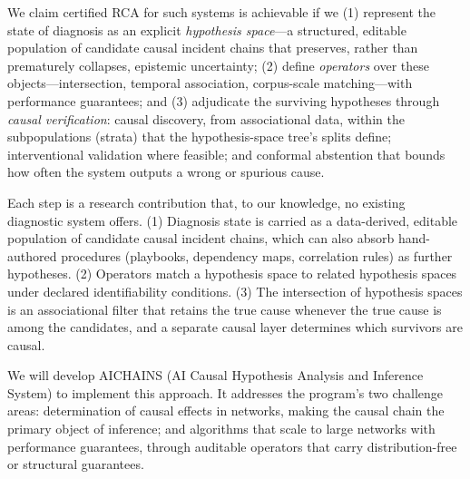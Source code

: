 \documentclass[12pt]{article}
\begin{document}
We claim certified RCA for such systems is achievable if we (1) represent the state of diagnosis as an explicit \emph{hypothesis space}---a structured, editable population of candidate causal incident chains that preserves, rather than prematurely collapses, epistemic uncertainty; (2) define \emph{operators} over these objects---intersection, temporal association, corpus-scale matching---with performance guarantees; and (3) adjudicate the surviving hypotheses through \emph{causal verification}: causal discovery, from associational data, within the subpopulations (strata) that the hypothesis-space tree's splits define; interventional validation where feasible; and conformal abstention that bounds how often the system outputs a wrong or spurious cause.

Each step is a research contribution that, to our knowledge, no existing diagnostic system offers. (1) Diagnosis state is carried as a data-derived, editable population of candidate causal incident chains, which can also absorb hand-authored procedures (playbooks, dependency maps, correlation rules) as further hypotheses. (2) Operators match a hypothesis space to related hypothesis spaces under declared identifiability conditions. (3) The intersection of hypothesis spaces is an associational filter that retains the true cause whenever the true cause is among the candidates, and a separate causal layer determines which survivors are causal.

We will develop AICHAINS (AI Causal Hypothesis Analysis and Inference System) to implement this approach. It addresses the program's two challenge areas: determination of causal effects in networks, making the causal chain the primary object of inference; and algorithms that scale to large networks with performance guarantees, through auditable operators that carry distribution-free or structural guarantees.
\end{document}
